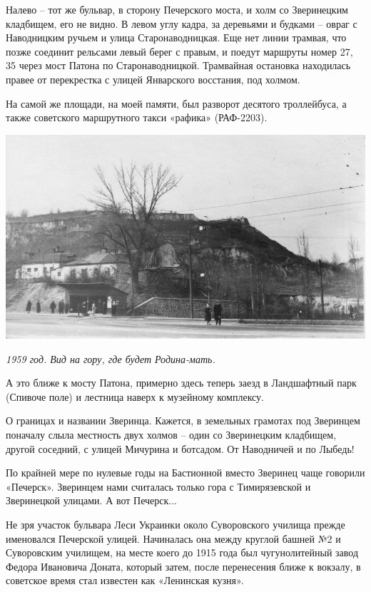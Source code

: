 Налево – тот же бульвар, в сторону Печерского моста, и холм со Зверинецким кладбищем, его не видно. В левом углу кадра, за деревьями и будками – овраг с Наводницким ручьем и улица Старонаводницкая. Еще нет линии трамвая, что позже соединит рельсами левый берег с правым, и поедут маршруты номер 27, 35 через мост Патона по Старонаводницкой. Трамвайная остановка находилась правее от перекрестка с улицей Январского восстания, под холмом.

На самой же площади, на моей памяти, был разворот десятого троллейбуса, а также советского маршрутного такси «рафика» (РАФ-2203).

\begin{center}
\includegraphics[width=\linewidth]{chast-vosp/zver/1959-navodnic-02.jpg}

\textit{1959 год. Вид на гору, где будет Родина-мать.}
\end{center}

А это ближе к мосту Патона, примерно здесь теперь заезд в Ландшафтный парк (Спивоче поле) и лестница наверх к музейному комплексу.

О границах и названии Зверинца. Кажется, в земельных грамотах под Зверинцем поначалу слыла местность двух холмов – один со Зверинецким кладбищем, другой соседний, с улицей Мичурина и ботсадом. От Наводничей и по Лыбедь!

По крайней мере по нулевые годы на Бастионной вместо Зверинец чаще говорили «Печерск». Зверинцем нами считалась только гора с Тимирязевской и Зверинецкой улицами. А вот Печерск...

Не зря участок бульвара Леси Украинки около Суворовского училища прежде именовался Печерской улицей. Начиналась она между круглой башней №2 и Суворовским училищем, на месте коего до 1915 года был чугунолитейный завод Федора Ивановича Доната, который затем, после перенесения ближе к вокзалу, в советское время стал известен как «Ленинская кузня».


